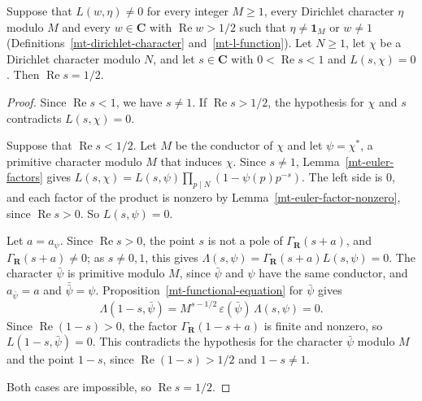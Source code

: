 \begin{proposition}\label{mt-strip-of-half-plane}
Suppose that $L(w,\eta)\neq0$ for every integer $M\geq1$, every Dirichlet character $\eta$ modulo
$M$ and every $w\in\mathbf C$ with $\operatorname{Re}w>1/2$ such that $\eta\neq\mathbf 1_M$ or
$w\neq1$ (Definitions~\ref{mt-dirichlet-character} and~\ref{mt-l-function}). Let $N\geq1$, let
$\chi$ be a Dirichlet character modulo $N$, and let $s\in\mathbf C$ with $0<\operatorname{Re}s<1$
and $L(s,\chi)=0$. Then $\operatorname{Re}s=1/2$.
\end{proposition}
\begin{proof}
Since $\operatorname{Re}s<1$, we have $s\neq1$. If $\operatorname{Re}s>1/2$, the hypothesis for
$\chi$ and $s$ contradicts $L(s,\chi)=0$.

Suppose that $\operatorname{Re}s<1/2$. Let $M$ be the conductor of $\chi$ and let $\psi=\chi^*$,
a primitive character modulo $M$ that induces $\chi$. Since $s\neq1$, Lemma~\ref{mt-euler-factors}
gives $L(s,\chi)=L(s,\psi)\prod_{p\mid N}(1-\psi(p)p^{-s})$. The left side is $0$, and each factor
of the product is nonzero by Lemma~\ref{mt-euler-factor-nonzero}, since $\operatorname{Re}s>0$. So
$L(s,\psi)=0$.

Let $a=a_\psi$. Since $\operatorname{Re}s>0$, the point $s$ is not a pole of $\Gamma_{\mathbf R}(s+a)$,
and $\Gamma_{\mathbf R}(s+a)\neq0$; as $s\neq0,1$, this gives
$\Lambda(s,\psi)=\Gamma_{\mathbf R}(s+a)L(s,\psi)=0$. The character $\bar\psi$ is primitive modulo
$M$, since $\bar\psi$ and $\psi$ have the same conductor, and $a_{\bar\psi}=a$ and
$\bar{\bar\psi}=\psi$. Proposition~\ref{mt-functional-equation} for $\bar\psi$ gives
\[
 \Lambda(1-s,\bar\psi)=M^{s-1/2}\,\varepsilon(\bar\psi)\,\Lambda(s,\psi)=0.
\]
Since $\operatorname{Re}(1-s)>0$, the factor $\Gamma_{\mathbf R}(1-s+a)$ is finite and nonzero, so
$L(1-s,\bar\psi)=0$. This contradicts the hypothesis for the character $\bar\psi$ modulo $M$ and the
point $1-s$, since $\operatorname{Re}(1-s)>1/2$ and $1-s\neq1$.

Both cases are impossible, so $\operatorname{Re}s=1/2$.
\end{proof}

